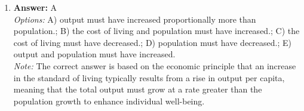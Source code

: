 \documentclass[12pt]{article}
\begin{document}
\begin{enumerate}[label=\arabic*.]
\\ \textit{Note:} The fixed effects panel model is also referred to as the pooled cross-sectional model because both approaches analyze data across multiple entities over time while controlling for unobserved individual heterogeneity, effectively pooling observations to estimate causal relationships.
\item \textbf{Answer:} A
\\ \textit{Options:} A) output must have increased proportionally more than population.; B) the cost of living and population must have increased.; C) the cost of living must have decreased.; D) population must have decreased.; E) output and population must have increased.
\\ \textit{Note:} The correct answer is based on the economic principle that an increase in the standard of living typically results from a rise in output per capita, meaning that the total output must grow at a rate greater than the population growth to enhance individual well-being.
\end{enumerate}
\end{document}
